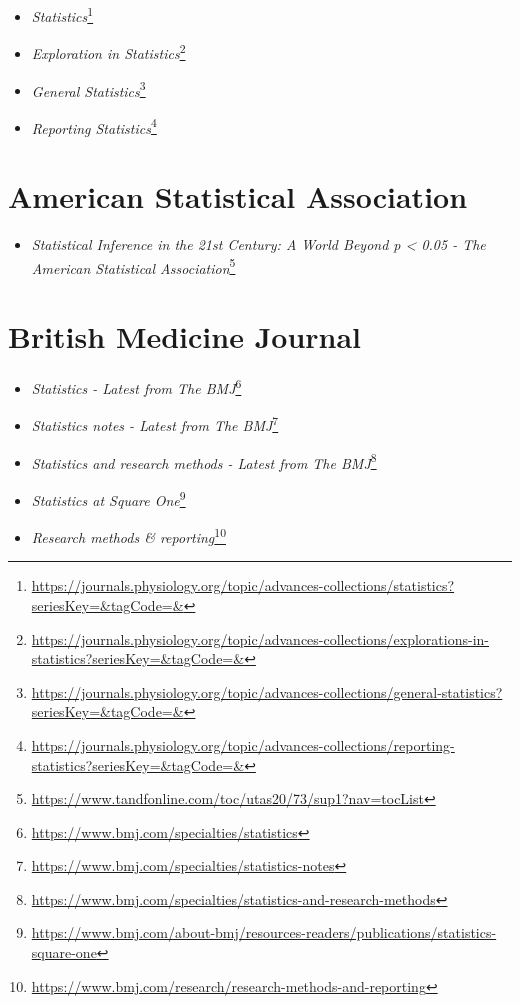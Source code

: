 \documentclass[
  a4paper,
]{book}
\providecommand{\tightlist}{%
  \setlength{\itemsep}{0pt}\setlength{\parskip}{0pt}}
\renewcommand{\href}[2]{#2\footnote{\url{#1}}}
\begin{document}
\begin{itemize}
\item
  \href{https://journals.physiology.org/topic/advances-collections/statistics?seriesKey=\&tagCode=\&}{\emph{Statistics}}
\item
  \href{https://journals.physiology.org/topic/advances-collections/explorations-in-statistics?seriesKey=\&tagCode=\&}{\emph{Exploration in Statistics}}
\item
  \href{https://journals.physiology.org/topic/advances-collections/general-statistics?seriesKey=\&tagCode=\&}{\emph{General Statistics}}
\item
  \href{https://journals.physiology.org/topic/advances-collections/reporting-statistics?seriesKey=\&tagCode=\&}{\emph{Reporting Statistics}}
\end{itemize}

\hypertarget{american-statistical-association}{%
\section*{American Statistical Association}\label{american-statistical-association}}

\begin{itemize}
\tightlist
\item
  \href{https://www.tandfonline.com/toc/utas20/73/sup1?nav=tocList}{\emph{Statistical Inference in the 21st Century: A World Beyond p \textless{} 0.05 - The American Statistical Association}}
\end{itemize}

\hypertarget{british-medicine-journal}{%
\section*{British Medicine Journal}\label{british-medicine-journal}}

\begin{itemize}
\item
  \href{https://www.bmj.com/specialties/statistics}{\emph{Statistics - Latest from The BMJ}}
\item
  \href{https://www.bmj.com/specialties/statistics-notes}{\emph{Statistics notes - Latest from The BMJ}}
\item
  \href{https://www.bmj.com/specialties/statistics-and-research-methods}{\emph{Statistics and research methods - Latest from The BMJ}}
\item
  \href{https://www.bmj.com/about-bmj/resources-readers/publications/statistics-square-one}{\emph{Statistics at Square One}}
\item
  \href{https://www.bmj.com/research/research-methods-and-reporting}{\emph{Research methods \& reporting}}
\end{itemize}
\end{document}
